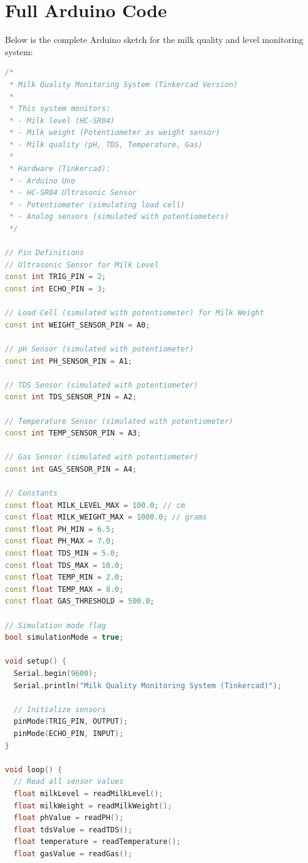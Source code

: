 \documentclass[12pt,a4paper]{article}
\begin{document}
\section{Full Arduino Code}

Below is the complete Arduino sketch for the milk quality and level monitoring system:

\begin{lstlisting}[language=C++, basicstyle=\ttfamily\small, breaklines=true, frame=single, caption={Full Arduino Code for Milk Monitoring System}]
/*
 * Milk Quality Monitoring System (Tinkercad Version)
 * 
 * This system monitors:
 * - Milk level (HC-SR04)
 * - Milk weight (Potentiometer as weight sensor)
 * - Milk quality (pH, TDS, Temperature, Gas)
 * 
 * Hardware (Tinkercad):
 * - Arduino Uno
 * - HC-SR04 Ultrasonic Sensor
 * - Potentiometer (simulating load cell)
 * - Analog sensors (simulated with potentiometers)
 */

// Pin Definitions
// Ultrasonic Sensor for Milk Level
const int TRIG_PIN = 2;
const int ECHO_PIN = 3;

// Load Cell (simulated with potentiometer) for Milk Weight
const int WEIGHT_SENSOR_PIN = A0;

// pH Sensor (simulated with potentiometer)
const int PH_SENSOR_PIN = A1;

// TDS Sensor (simulated with potentiometer)
const int TDS_SENSOR_PIN = A2;

// Temperature Sensor (simulated with potentiometer)
const int TEMP_SENSOR_PIN = A3;

// Gas Sensor (simulated with potentiometer)
const int GAS_SENSOR_PIN = A4;

// Constants
const float MILK_LEVEL_MAX = 100.0; // cm
const float MILK_WEIGHT_MAX = 1000.0; // grams
const float PH_MIN = 6.5;
const float PH_MAX = 7.0;
const float TDS_MIN = 5.0;
const float TDS_MAX = 10.0;
const float TEMP_MIN = 2.0;
const float TEMP_MAX = 8.0;
const float GAS_THRESHOLD = 500.0;

// Simulation mode flag
bool simulationMode = true;

void setup() {
  Serial.begin(9600);
  Serial.println("Milk Quality Monitoring System (Tinkercad)");
  
  // Initialize sensors
  pinMode(TRIG_PIN, OUTPUT);
  pinMode(ECHO_PIN, INPUT);
}

void loop() {
  // Read all sensor values
  float milkLevel = readMilkLevel();
  float milkWeight = readMilkWeight();
  float phValue = readPH();
  float tdsValue = readTDS();
  float temperature = readTemperature();
  float gasValue = readGas();
  

\end{lstlisting}
\end{document}
